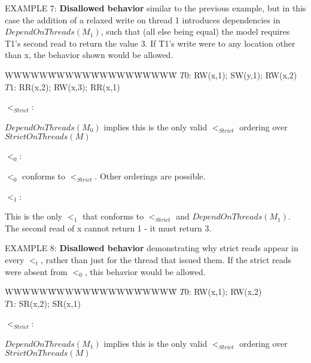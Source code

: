 \pagebreak
\np EXAMPLE 7: \textbf{Disallowed behavior} 
similar to the previous example, but in this case
the addition of a relaxed write on thread 1 introduces dependencies in 
$DependOnThreads(M_1)$, such that (all else being equal) the model requires T1's second read
to return the value 3. If T1's write were to any location other than x, 
the behavior shown would be allowed.
\begin{tabbing}WWWWW\=WWWWW\=WWWWW\=WWWWW\=\kill
$T0$: \> RW(x,1); \> SW(y,1); \> RW(x,2)\\
$T1$: \> RR(x,2); \> RW(x,3); \> RR(x,1)\\
\end{tabbing}

\bigskip
$<_{Strict}$:\hspace{0.1in}
\hspace{0.1in}
\parbox[t]{2.5in}
{$DependOnThreads(M_0)$ implies this is the only valid $<_{Strict}$ ordering
over $StrictOnThreads(M)$}

\bigskip
$<_0$:\hspace{0.1in}
\hspace{0.25in}
\parbox[t]{2.5in}
{$<_0$ conforms to $<_{Strict}$. Other orderings are possible.}

\bigskip
$<_1$:\hspace{0.1in}
\hspace{0.25in}
\parbox[t]{2.5in}
{This is the only $<_1$ that conforms to $<_{Strict}$ and $DependOnThreads(M_1)$.
The second read of x cannot return 1 - it must return 3.}

\bigskip
\np EXAMPLE 8: \textbf{Disallowed behavior} 
demonstrating why strict reads appear in every $<_t$,
rather than just for the thread that issued them. If the strict reads were 
absent from $<_0$, this behavior would be allowed.

\begin{tabbing}WWWWW\=WWWWW\=WWWWW\=WWWWW\=\kill
$T0$: \> RW(x,1); \> RW(x,2)\\
$T1$: \> SR(x,2); \> SR(x,1)\\
\end{tabbing}
\pagebreak
$<_{Strict}$:\hspace{0.25in}
\hspace{0.4in}
\parbox[t]{2.5in}
{$DependOnThreads(M_1)$ implies this is the only valid $<_{Strict}$ ordering
over $StrictOnThreads(M)$}

